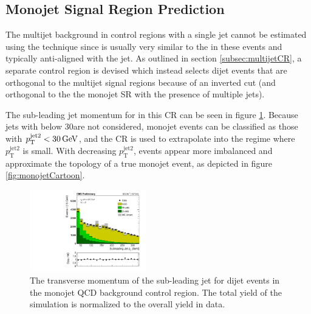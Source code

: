 \subsection{Monojet Signal Region Prediction}
\label{subsec:qcdMonojet}
The multijet background in control regions with a single jet cannot be estimated using the \dphi technique since \MET is usually very similar to the \HT in these events and typically anti-aligned with the jet. As outlined in section \ref{subsec:multijetCR}, a separate control region is devised which instead selects dijet events that are orthogonal to the multijet signal regions because of an inverted \dphilong cut (and orthogonal to the the monojet SR with the presence of multiple jets). 

The sub-leading jet momentum for in this CR can be seen in figure \ref{fig:subleadingJetPt}. Because jets with \pt below 30\GeV are not considered, monojet events can be classified as those with $p_{\mathrm{T}}^{\mathrm{jet2}} < 30\,\text{Ge\hspace{-.08em}V}$, and the CR is used to extrapolate into the regime where $p_{\mathrm{T}}^{\mathrm{jet2}}$ is small. With decreasing $p_{\mathrm{T}}^{\mathrm{jet2}}$, events appear more imbalanced and approximate the topology of a true monojet event, as depicted in figure \ref{fig:monojetCartoon}.
\begin{figure}
	\centering
	\includegraphics[width=0.45\textwidth]{backgrounds/figs/jet2_pt_35p9ifb}
	\renewcommand{\baselinestretch}{1.0}
	\caption[The transverse momentum of the sub-leading jet for dijet events in the monojet QCD background control region.]{The transverse momentum of the sub-leading jet for dijet events in the monojet QCD background control region. The total yield of the simulation is normalized to the overall yield in data.}
	\label{fig:subleadingJetPt}
\end{figure}

